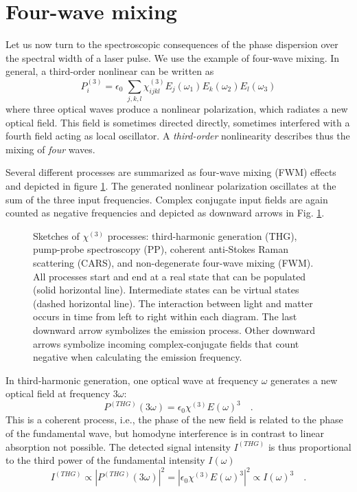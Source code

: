 		
\section{Four-wave mixing}

Let us now turn to the spectroscopic consequences of the phase dispersion over the spectral width of a laser pulse. We use the example of four-wave mixing. In general, a third-order nonlinear can be written as
\begin{equation}
  P^{(3)}_i = \epsilon_0 \; 
    \sum_{j,k,l} \chi^{(3)}_{ijkl} E_j(\omega_1) E_k(\omega_2) E_l(\omega_3)  
\end{equation}		
where three optical waves produce a nonlinear polarization, which radiates a new optical field. This field is sometimes directed directly, sometimes interfered with  a fourth field acting as local oscillator. A \emph{third-order} nonlinearity describes thus the mixing of \emph{four} waves.
		
		
Several different processes are 	summarized as four-wave mixing (FWM) effects and depicted in figure \ref{fig:processes}.  The generated nonlinear polarization oscillates at the sum of the three input frequencies. Complex conjugate input fields are again counted as negative frequencies and depicted as downward arrows in Fig. \ref{fig:processes}.
	
\begin{figure}
   
\caption{Sketches of  $\chi^{(3)}$ processes:
%
third-harmonic generation (THG), pump-probe spectroscopy (PP), coherent anti-Stokes Raman scattering (CARS), and  non-degenerate four-wave mixing (FWM).
%
 All processes start and end at a real state  that can be populated (solid horizontal line). Intermediate states can be virtual states (dashed horizontal line). The interaction between light and matter occurs in time from left to right within each diagram. The last downward arrow symbolizes the emission process. Other downward  arrows symbolize incoming complex-conjugate fields that count negative when calculating the emission frequency.
\label{fig:processes}}
\end{figure}

In third-harmonic generation, one optical wave at frequency $\omega$ generates a new optical field at frequency $3 \omega$: 
%
\begin{equation}
P^{(THG)}(3 \omega) = \epsilon_0 \chi^{(3)} E(\omega)^3  \quad .
\label{eq:chi3-thg}
\end{equation}
%
This is a coherent process, i.e., the phase of the new field is related to the phase of the fundamental wave, but homodyne interference is in contrast to linear absorption not possible. The detected signal intensity $I^{(THG)}$ is thus proportional to the third power of the fundamental intensity $I(\omega)$
\begin{equation}
I^{(THG)} \propto \left| P^{(THG)}(3 \omega) \right|^2 = \left| \epsilon_0 \chi^{(3)} E(\omega)^3 \right|^2 \propto I(\omega)^3 \quad .
\label{eq:intensi-thg}
\end{equation}


